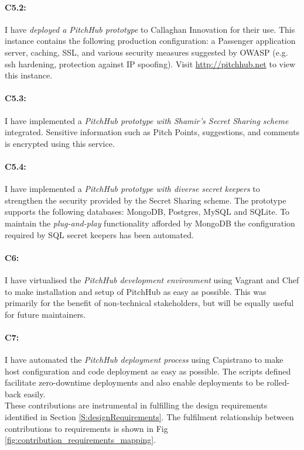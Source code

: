 \paragraph{C5.2:} I have {\em deployed a PitchHub prototype} to Callaghan Innovation for their use. This instance contains the following production configuration: a Passenger application server, caching, SSL, and various security measures suggested by OWASP (e.g. ssh hardening, protection against IP spoofing). Visit \url{http://pitchhub.net} to view this instance.


\paragraph{C5.3:} I have implemented a {\em PitchHub prototype with Shamir's Secret Sharing scheme} integrated. Sensitive information such as Pitch Points, suggestions, and comments is encrypted using this service.

\paragraph{C5.4:} I have implemented a {\em PitchHub prototype with diverse secret keepers} to strengthen the security provided by the Secret Sharing scheme. The prototype supports the following databases: MongoDB, Postgres, MySQL and SQLite. To maintain the \textit{plug-and-play} functionality afforded by MongoDB the configuration required by SQL secret keepers has been automated.

\paragraph{C6:} I have virtualised the {\em PitchHub development environment} using Vagrant and Chef to make installation and setup of PitchHub as easy as possible. This was primarily for the benefit of non-technical stakeholders, but will be equally useful for future maintainers.

\paragraph{C7:} I have automated the {\em PitchHub deployment process} using Capistrano to make host configuration and code deployment as easy as possible. The scripts defined facilitate zero-downtime deployments and also enable deployments to be rolled-back easily.
\\
\newline
These contributions are instrumental in fulfilling the design requirements identified in Section \ref{S:designRequirements}. The fulfilment relationship between contributions to requirements is shown in Fig \ref{fig:contribution_requirements_mapping}.

